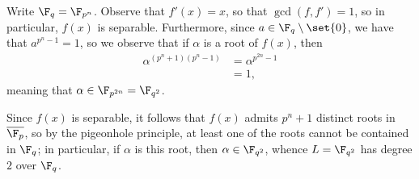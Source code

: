 \documentclass[10pt]{mypackage}
\begin{document}
\begin{solution}
  Write $\F_q = \F_{p^{n}}$. Observe that $f'(x) = x$, so that $\gcd\left( f,f' \right) = 1$, so in particular, $f(x)$ is separable. Furthermore, since $a\in \F_{q}\setminus \set{0}$, we have that $a^{p^n-1} = 1$, so we observe that if $\alpha$ is a root of $f(x)$, then
  \begin{align*}
    \alpha^{\left( p^n+1 \right)\left( p^n-1 \right)} &= \alpha^{p^{2n}-1}\\
                                                      &= 1,
  \end{align*}
  meaning that $\alpha\in \F_{p^{2n}} = \F_{q^2}$.

  Since $f(x)$ is separable, it follows that $f(x)$ admits $p^n + 1$ distinct roots in $ \overline{\F_p} $, so by the pigeonhole principle, at least one of the roots cannot be contained in $\F_q$; in particular, if $\alpha$ is this root, then $\alpha\in \F_{q^2}$, whence $L = \F_{q^2}$ has degree $2$ over $\F_q$.
\end{solution}
\end{document}
